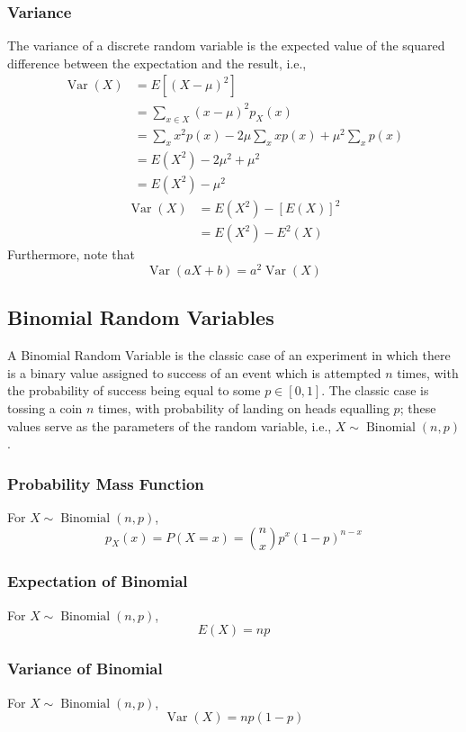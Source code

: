 \documentclass{amsart}
\DeclareMathOperator{\Var}{\text{Var}}
\DeclareMathOperator{\bin}{\text{Binomial}}
\begin{document}
				\subsubsection{Variance}
				The variance of a discrete random variable is the expected value of the squared difference between the expectation and the result, i.e.,
					\begin{align*}
						\Var(X) &= E\left[(X-\mu)^{2}\right] \\
						&= \sum_{x \in X} (x - \mu)^{2} p_{X}(x) \\
						&= \sum_{x} x^{2} p(x) - 2\mu\sum_{x} x p(x) + \mu^{2} \sum_{x} p(x) \\
						&= E(X^{2}) - 2\mu^{2} + \mu^{2} \\
						&= E(X^{2}) - \mu^{2}
					\end{align*}
					\begin{align*}
						\Var(X) &= E(X^{2}) - \left[E(X)\right]^{2} \\
						&= E(X^{2}) - E^{2}(X)
					\end{align*}
				Furthermore, note that 
					$$
						\Var(aX + b) = a^{2}\Var(X)
					$$
		
		\subsection{Binomial Random Variables}
		A Binomial Random Variable is the classic case of an experiment in which there is a binary value assigned to success of an event which is attempted $n$ times, with the probability of success being equal to some $p \in [0,1]$. The classic case is tossing a coin $n$ times, with probability of landing on heads equalling $p$; these values serve as the parameters of the random variable, i.e., $X \sim \bin(n,p)$.
			\subsubsection{Probability Mass Function}
			For $X \sim \bin(n,p)$,
				$$
					p_{X}(x) = P(X = x) = \binom{n}{x} p^{x} (1-p)^{n-x}
				$$
				
			\subsubsection{Expectation of Binomial}
			For $X \sim \bin(n,p)$,
				$$
					E(X) = 	np
				$$
				
			\subsubsection{Variance of Binomial}
			For $X \sim \bin(n,p)$,
				$$
					\Var(X) = np(1-p)
				$$
		
\end{document}
